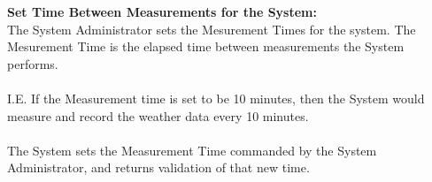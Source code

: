 \documentclass[letterpaper]{article}
\begin{document}
\noindent
\textbf{Set Time Between Measurements for the System:  }\\
The System Administrator sets the Mesurement Times for the system.
The Mesurement Time is the elapsed time between measurements the
System performs.\\\\
I.E. If the Measurement time is set to be 10
minutes, then the System would measure and record the weather data
every 10 minutes.\\\\
The System sets the Measurement Time commanded by the System
Administrator, and returns validation of that new time.
\end{document}
